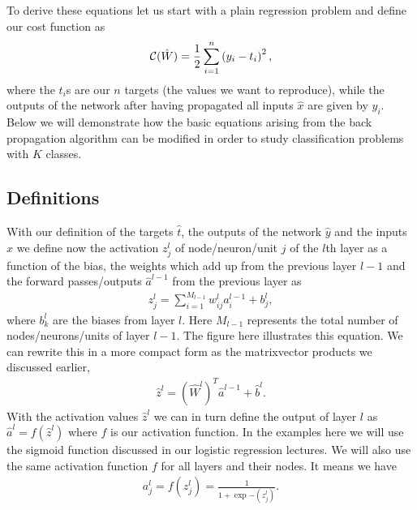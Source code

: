 \documentclass[letterpaper,10pt,english]{sphinxmanual}
\begin{document}
To derive these equations let us start with a plain regression problem
and define our cost function as
\begin{equation*}
\begin{split}
{\cal C}(\hat{W})  =  \frac{1}{2}\sum_{i=1}^n\left(y_i - t_i\right)^2,
\end{split}
\end{equation*}
where the \(t_i\)s are our \(n\) targets (the values we want to
reproduce), while the outputs of the network after having propagated
all inputs \(\hat{x}\) are given by \(y_i\).  Below we will demonstrate
how the basic equations arising from the back propagation algorithm
can be modified in order to study classification problems with \(K\)
classes.


\subsection{Definitions}
\label{\detokenize{chapter6:definitions}}
With our definition of the targets \(\hat{t}\), the outputs of the
network \(\hat{y}\) and the inputs \(\hat{x}\) we
define now the activation \(z_j^l\) of node/neuron/unit \(j\) of the
\(l\)\sphinxhyphen{}th layer as a function of the bias, the weights which add up from
the previous layer \(l-1\) and the forward passes/outputs
\(\hat{a}^{l-1}\) from the previous layer as
\begin{equation*}
\begin{split}
z_j^l = \sum_{i=1}^{M_{l-1}}w_{ij}^la_i^{l-1}+b_j^l,
\end{split}
\end{equation*}
where \(b_k^l\) are the biases from layer \(l\).  Here \(M_{l-1}\)
represents the total number of nodes/neurons/units of layer \(l-1\). The
figure here illustrates this equation.  We can rewrite this in a more
compact form as the matrix\sphinxhyphen{}vector products we discussed earlier,
\begin{equation*}
\begin{split}
\hat{z}^l = \left(\hat{W}^l\right)^T\hat{a}^{l-1}+\hat{b}^l.
\end{split}
\end{equation*}
With the activation values \(\hat{z}^l\) we can in turn define the
output of layer \(l\) as \(\hat{a}^l = f(\hat{z}^l)\) where \(f\) is our
activation function. In the examples here we will use the sigmoid
function discussed in our logistic regression lectures. We will also use the same activation function \(f\) for all layers
and their nodes.  It means we have
\begin{equation*}
\begin{split}
a_j^l = f(z_j^l) = \frac{1}{1+\exp{-(z_j^l)}}.
\end{split}
\end{equation*}
\end{document}
